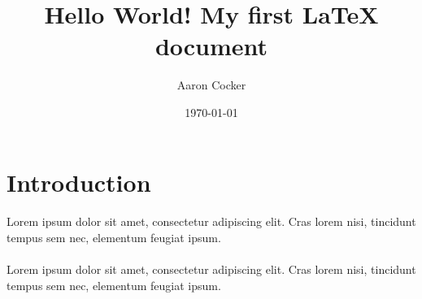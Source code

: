 \documentclass[a4paper,12pt]{article}
\begin{document}
\title{Hello World! My first LaTeX document}
\author{Aaron Cocker}
\date{\today}
\maketitle

\section{Introduction}

\paragraph{}
Lorem ipsum dolor sit amet, consectetur adipiscing elit. Cras lorem nisi, tincidunt tempus sem nec, elementum feugiat ipsum. 

\paragraph{}
Lorem ipsum dolor sit amet, consectetur adipiscing elit. Cras lorem nisi, tincidunt tempus sem nec, elementum feugiat ipsum. 
\end{document}
